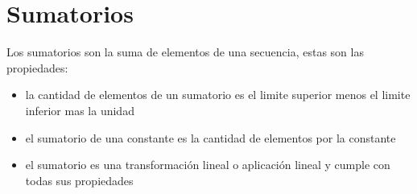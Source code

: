 \section{Sumatorios}
Los sumatorios son la suma de elementos de una secuencia, estas son las propiedades:
\begin{itemize}
\item la cantidad de elementos de un sumatorio es el limite superior menos el limite inferior mas la unidad
\item el sumatorio de una constante es la cantidad de elementos por la constante
\item el sumatorio es una transformación lineal o aplicación lineal y cumple con todas sus propiedades
\end{itemize}
